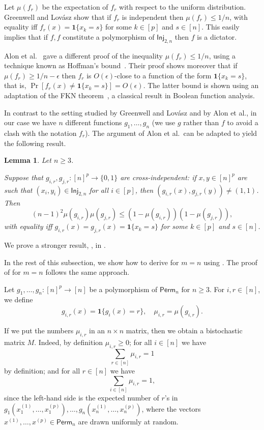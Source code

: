 \documentclass{article}
\providecommand{\Inj}{\mathsf{Inj}}
\providecommand{\Perm}{\mathsf{Perm}}
\providecommand{\ind}[1]{\mathbf1\{#1\}}
\newtheorem{lemma}[theorem]{Lemma}
\theoremstyle{definition}
\theoremstyle{remark}
\begin{document}
Let $\mu(f_r)$ be the expectation of $f_r$ with respect to the uniform distribution. Greenwell and Lov\'asz show that if $f_r$ is independent then $\mu(f_r) \leq 1/n$, with equality iff $f_r(x) = \ind{x_k = s}$ for some $k \in [p]$ and $s \in [n]$. This easily implies that if $f,f$ constitute a polymorphism of $\Inj_{2,n}$ then $f$ is a dictator.

Alon et al.~\cite{ADFS} gave a different proof of the inequality $\mu(f_r) \leq 1/n$, using a technique known as Hoffman's bound~\cite{Hoffman,Friedgut,Haemers}. Their proof shows moreover that if $\mu(f_r) \ge 1/n - \epsilon$ then $f_r$ is $O(\epsilon)$-close to a function of the form $\ind{x_k = s}$, that is, $\Pr[f_r(x) \neq \ind{x_k = s}] = O(\epsilon)$. The latter bound is shown using an adaptation of the FKN theorem~\cite{FKN}, a classical result in Boolean function analysis.

In contrast to the setting studied by Greenwell and Lov\'asz and by Alon et al., in our case we have $n$ different functions $g_1,\dots,g_n$ (we use $g$ rather than $f$ to avoid a clash with the notation $f_r$). The argument of Alon et al.\ can be adapted to yield the following result.

\begin{lemma}
\label{lem:adfs-exact}
Let $n \ge 3$.

Suppose that $g_{i,r},g_{j,r}\colon [n]^p \to \{0, 1\}$ are \emph{cross-independent}: if $x,y \in [n]^p$ are such that $(x_i,y_i) \in \Inj_{2,n}$ for all $i \in [p]$, then $(g_{i,r}(x),g_{j,r}(y)) \neq (1,1)$. Then
\[
 (n - 1)^2 \mu(g_{i,r}) \mu(g_{j,r}) \leq (1 - \mu(g_{i,r})) (1 - \mu(g_{j,r})),
\]
with equality iff $g_{i,r}(x) = g_{j,r}(x) = \ind{x_k = s}$ for some $k \in [p]$ and $s \in [n]$.
\end{lemma}

We prove a stronger result, , in .

In the rest of this subsection, we show how to derive  for $m = n$ using . The proof of  for $m = n$ follows the same approach.

\smallskip

Let $g_1,\dots,g_n\colon [n]^p \to [n]$ be a polymorphism of $\Perm_n$ for $n \ge 3$. For $i,r \in [n]$, we define
\[
 g_{i,r}(x) = \ind{g_i(x) = r}, \quad \mu_{i,r} = \mu(g_{i,r}).
\]

If we put the numbers $\mu_{i,r}$ in an $n \times n$ matrix, then we obtain a bistochastic matrix $M$. Indeed, by definition $\mu_{i,r} \ge 0$; for all $i \in [n]$ we have
\begin{equation*} %
 \sum_{r \in [n]} \mu_{i,r} = 1
\end{equation*}
by definition; and for all $r \in [n]$ we have
\begin{equation} \label{eq:i-sum}
 \sum_{i \in [n]} \mu_{i,r} = 1,
\end{equation}
since the left-hand side is the expected number of $r$'s in $g_1(x^{(1)}_1,\dots,x^{(p)}_1), \dots, g_n(x^{(1)}_n,\dots,x^{(p)}_n)$, where the vectors $x^{(1)},\dots,x^{(p)} \in \Perm_n$ are drawn uniformly at random.
\end{document}
